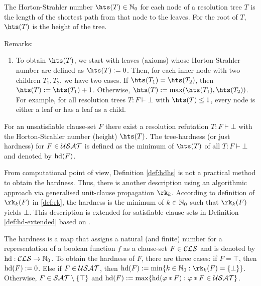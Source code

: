 \documentclass{report}
\begin{document}
\begin{defi}\label{def:hsn}
The Horton-Strahler number $\hts(T) \in \NNZ$ for each node of a resolution tree $T$ is the length of the shortest path from that node to the leaves. For the root of $T$,  $\hts(T)$ is the height of the tree.
\end{defi}
Remarks:
\begin{enumerate}
  \item To obtain $\hts(T)$, we start with leaves (axioms) whose Horton-Strahler number are defined as $\hts(T) := 0$. Then, for each inner node with two children $T_1, T_2$, we have two cases. If $\hts(T_1)= \hts(T_2)$, then $\hts(T) := \hts(T_1)+ 1$. Otherwise, $\hts(T) := \max(\hts(T_1),\hts(T_2))$.  For example, for all resolution trees $T:F \vdash \bot$ with $\hts(T) \leq 1$, every node is either a leaf or has a leaf as a child.
\end{enumerate}

\begin{defi}\label{def:hdhs}
\cite{h18} For an unsatisfiable clause-set $F$ there exist a resolution refutation $T:F \vdash \bot$ with the Horton-Strahler number (height) $\hts(T)$. The tree-hardness (or just hardness) for $F \in \mathcal{USAT}$ is defined as the minimum of $\hts(T)$ of all  $T:F \vdash \bot$ and denoted by $\operatorname{hd}(F)$.
\end{defi}

From computational point of view, Definition \ref{def:hdhs} is not a practical method to obtain the hardness. Thus, there is another description using an algorithmic approach via generalised unit-clause propagation $\rk_k$. According to definition of $\rk_k(F)$ in \ref{def:rk}, the hardness is the minimum of $k \in \mathbb{N}_0$ such that $\rk_k(F)$ yields $\bot$. This description is extended for satisfiable clause-sets in Definition \ref{def:hd-extended} based on \cite{h18, h8}.

\begin{defi}\label{def:hd-extended}
The hardness is a map that assigns a natural (and finite) number for a representation of a boolean function $f$ as a clause-set $F \in \mathcal{CLS}$ and is denoted by $\operatorname{hd} : \mathcal{CLS} \rightarrow \mathbb{N}_0$. To obtain the hardness of  $F$, there are three cases: if $F = \top$, then $\operatorname{hd}(F) := 0$. Else if $F \in \mathcal{USAT}$, then $\hardness(F) := \min \set{k \in \NNZ : \rk_k(F)=\set{\bot}}$. Otherwise, $F \in \mathcal{SAT} \setminus \{ \top \}$ and $\operatorname{hd}(F) := \max \{  \operatorname{hd}(\varphi * F) : \varphi * F \in \mathcal{USAT}  \}$.
\end{defi}
\end{document}
